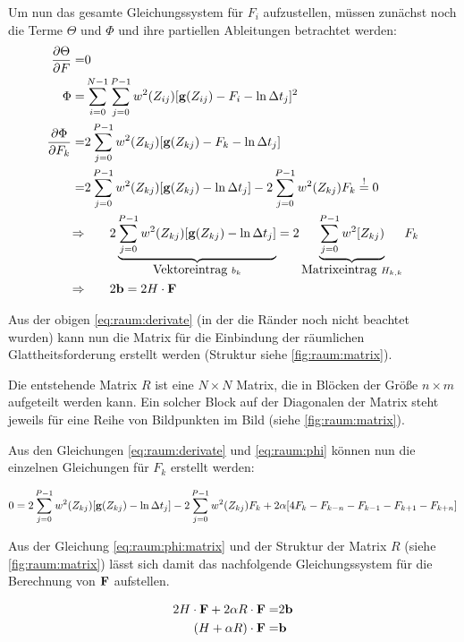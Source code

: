 Um nun das gesamte Gleichungssystem für $F_i$ aufzustellen, müssen zunächst noch die Terme $\Theta$ und $\Phi$ und ihre partiellen Ableitungen betrachtet werden:
\begin{align}
\frac{\partial \Theta}{\partial F} =& 0\\
\Phi =&\sum_{i=0}^{N-1} \sum_{j=0}^{P-1} w^2(Z_{ij})[\mathbf g(Z_{ij}) - F_i - \ln \Delta t_j]^2\\
\frac{\partial \Phi}{\partial F_k} =& 2 \sum_{j=0}^{P-1} w^2(Z_{kj})[\mathbf g(Z_{kj}) -F_k-\ln \Delta t_j]\\
\label{eq:raum:phi}
=& 2 \sum_{j=0}^{P-1} w^2(Z_{kj})[\mathbf g(Z_{kj}) -\ln \Delta t_j] - 2 \sum_{j=0}^{P-1} w^2(Z_{kj})F_k \overset{!}{=}0\\
\Rightarrow & \qquad 2 \underbrace{\sum_{j=0}^{P-1} w^2(Z_{kj})[\mathbf g(Z_{kj}) -\ln \Delta t_j]}_{\mbox{Vektoreintrag }b_k} = 2 \underbrace{\sum_{j=0}^{P-1} w^2[Z_{kj})}_{\mbox{Matrixeintrag } H_{k,k}}F_k\\
\label{eq:raum:phi:matrix}
\Rightarrow & \qquad 2 \mathbf b = 2 H \cdot \mathbf F
\end{align}


Aus der obigen \autoref{eq:raum:derivate} (in der die Ränder noch nicht beachtet wurden) kann nun die Matrix für die Einbindung der räumlichen Glattheitsforderung erstellt werden (Struktur siehe \autoref{fig:raum:matrix}).

Die entstehende Matrix $R$ ist eine $N \times N$ Matrix, die in Blöcken der Größe $n \times m$ aufgeteilt werden kann. Ein solcher Block auf der Diagonalen der Matrix  steht jeweils für eine Reihe von Bildpunkten im Bild (siehe \autoref{fig:raum:matrix}). 

Aus den Gleichungen \ref{eq:raum:derivate} und \ref{eq:raum:phi} können nun die einzelnen Gleichungen für $F_k$ erstellt werden:

\begin{align}
 0 = 2 \sum_{j=0}^{P-1} w^2(Z_{kj})[\mathbf g(Z_{kj}) -\ln \Delta t_j] - 2 \sum_{j=0}^{P-1} w^2(Z_{kj})F_k + 2\alpha [4 F_k-F_{k-n} - F_{k-1} - F_{k+1} - F_{k+n}]
\end{align}

Aus der Gleichung \ref{eq:raum:phi:matrix} und der Struktur der Matrix $R$ (siehe \autoref{fig:raum:matrix}) lässt sich damit das nachfolgende Gleichungssystem für die Berechnung von $\mathbf F$ aufstellen. 

\begin{align}
2 H \cdot \mathbf F + 2 \alpha R\cdot \mathbf F =& 2 \mathbf b \\
\label{eq:raum:res}
(H+\alpha R)\cdot \mathbf F =& \mathbf b
\end{align}

